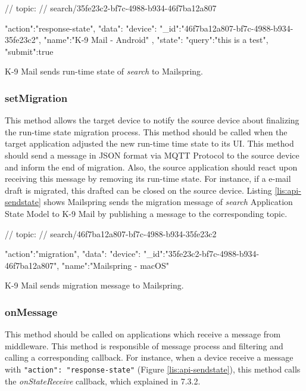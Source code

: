 \FloatBarrier
\begin{code}
\begin{js2}
// topic:
// search/35fe23c2-bf7c-4988-b934-46f7ba12a807
\end{js2}

\begin{json}
{
   "action":"response-state",
   "data":{
      "device":{
         "_id":"46f7ba12a807-bf7c-4988-b934-35fe23c2",
         "name":"K-9 Mail - Android"
      },
      "state":{
         "query":"this is a test",
         "submit":true
      }
   }
}
\end{json}
\caption{K-9 Mail sends run-time state of \textit{search} to Mailspring.}
\label{lis:api-sendstate}
\end{code}
\FloatBarrier

\subsubsection{setMigration}
This method allows the target device to notify the source device about finalizing the run-time state migration process. This method should be called when the target application adjusted the new run-time time state to its UI. This method should send a message in JSON format via MQTT Protocol to the source device and inform the end of migration. Also, the source application should react upon receiving this message by removing its run-time state. For instance, if a e-mail draft is migrated, this drafted can be closed on the source device. Listing \ref{lis:api-sendstate} shows Mailspring sends the migration message of \textit{search} Application State Model to K-9 Mail by publishing a message to the corresponding topic.

\FloatBarrier
\begin{code}
\begin{js2}
// topic:
// search/46f7ba12a807-bf7c-4988-b934-35fe23c2
\end{js2}

\begin{json}
{
   "action":"migration",
   "data":{
      "device":{
         "_id":"35fe23c2-bf7c-4988-b934-46f7ba12a807",
         "name":"Mailspring - macOS"
      }
   }
}
\end{json}
\caption{K-9 Mail sends migration message to Mailspring.}
\label{lis:api-setmigration}
\end{code}
\FloatBarrier

\subsubsection{onMessage}
This method should be called on applications which receive a message from middleware. This method is responsible of message process and filtering and calling a corresponding callback. For instance, when a device receive a message with \texttt{{"action": "response-state"}} (Figure \ref{lis:api-sendstate}), this method calls the \textit{onStateReceive} callback, which explained in 7.3.2.


